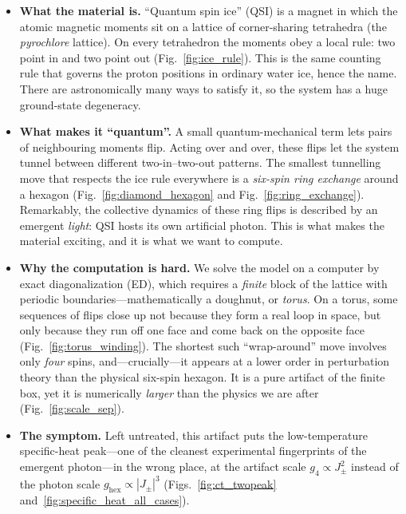 \documentclass[11pt,letterpaper]{article}
\theoremstyle{plain}
\theoremstyle{definition}
\begin{document}
\begin{itemize}
\item \textbf{What the material is.}  ``Quantum spin ice'' (QSI) is a magnet
in which the atomic magnetic moments sit on a lattice of corner-sharing
tetrahedra (the \emph{pyrochlore} lattice).  On every tetrahedron the moments
obey a local rule: two point in and two point out
(Fig.~\ref{fig:ice_rule}).  This is the same counting rule that governs the
proton positions in ordinary water ice, hence the name.  There are
astronomically many ways to satisfy it, so the system has a huge
ground-state degeneracy.

\item \textbf{What makes it ``quantum''.}  A small quantum-mechanical term
lets pairs of neighbouring moments flip.  Acting over and over, these flips
let the system tunnel between different two-in--two-out patterns.  The
smallest tunnelling move that respects the ice rule everywhere is a
\emph{six-spin ring exchange} around a hexagon
(Fig.~\ref{fig:diamond_hexagon} and Fig.~\ref{fig:ring_exchange}).  Remarkably,
the collective dynamics of these ring flips is described by an emergent
\emph{light}: QSI hosts its own artificial photon.  This is what makes the
material exciting, and it is what we want to compute.

\item \textbf{Why the computation is hard.}  We solve the model on a computer
by exact diagonalization (ED), which requires a \emph{finite} block of the
lattice with periodic boundaries---mathematically a doughnut, or
\emph{torus}.  On a torus, some sequences of flips close up not because they
form a real loop in space, but only because they run off one face and come
back on the opposite face (Fig.~\ref{fig:torus_winding}).  The shortest such
``wrap-around'' move involves only \emph{four} spins, and---crucially---it
appears at a lower order in perturbation theory than the physical six-spin
hexagon.  It is a pure artifact of the finite box, yet it is numerically
\emph{larger} than the physics we are after (Fig.~\ref{fig:scale_sep}).

\item \textbf{The symptom.}  Left untreated, this artifact puts the
low-temperature specific-heat peak---one of the cleanest experimental
fingerprints of the emergent photon---in the wrong place, at the artifact
scale $g_4\propto J_\pm^2$ instead of the photon scale
$g_{\mathrm{hex}}\propto|J_\pm|^3$ (Figs.~\ref{fig:ct_twopeak}
and~\ref{fig:specific_heat_all_cases}).


\end{itemize}
\end{document}

